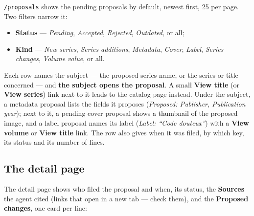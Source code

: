 \texttt{/proposals} shows the pending proposals by default, newest
first, 25 per page. Two filters narrow it:

\begin{itemize}
  \item \textbf{Status} --- \emph{Pending}, \emph{Accepted},
        \emph{Rejected}, \emph{Outdated}, or all;
  \item \textbf{Kind} --- \emph{New series}, \emph{Series additions},
        \emph{Metadata}, \emph{Cover}, \emph{Label},
        \emph{Series changes}, \emph{Volume value}, or all.
\end{itemize}

Each row names the subject --- the proposed series name, or the
series or title concerned --- and \textbf{the subject opens the
proposal}. A small \textbf{View title} (or \textbf{View series}) link
next to it leads to the catalog page instead. Under the subject, a
metadata proposal lists the fields it proposes (\emph{Proposed:
Publisher, Publication year}); next to it, a pending cover proposal
shows a thumbnail of the proposed image, and a label proposal names
its label (\emph{Label: ``Code douteux''}) with a \textbf{View
volume} or \textbf{View title} link. The row also gives when it was filed, by which key,
its status and its number of lines.

\subsection{The detail page}

The detail page shows who filed the proposal and when, its status,
the \textbf{Sources} the agent cited (links that open in a new tab ---
check them), and the \textbf{Proposed changes}, one card per line:

